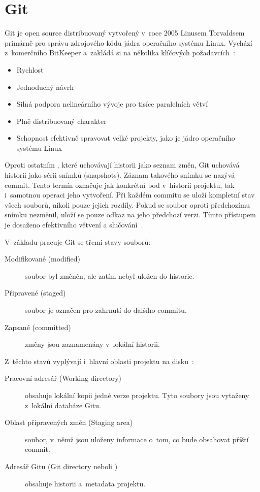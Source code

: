 
\section{Git}
\label{sec:git}
Git je open source distribuovaný \VCS vytvořený v~roce 2005 Linusem Torvaldsem primárně pro správu zdrojového kódu jádra operačního systému Linux. Vychází z~komerčního \VCS BitKeeper a~zakládá si na několika klíčových požadavcích~\cite{chacon2014progit}:
\begin{itemize}
  \item Rychlost
  \item Jednoduchý návrh
  \item Silná podpora nelineárního vývoje pro tisíce paralelních větví
  \item Plně distribuovaný charakter
  \item Schopnost efektivně spravovat velké projekty, jako je jádro operačního systému Linux
\end{itemize}

Oproti ostatním \VCS, které uchovávají historii jako seznam změn, Git uchovává historii jako sérii snímků (snapshots). Záznam takového snímku se nazývá commit. Tento termín označuje jak konkrétní bod v~historii projektu, tak i~samotnou operaci jeho vytvoření. Při každém commitu se uloží kompletní stav všech souborů, nikoli pouze jejich rozdíly. Pokud se soubor oproti předchozímu snímku nezměnil, uloží se pouze odkaz na jeho předchozí verzi. Tímto přístupem je dosaženo efektivního větvení a slučování~\cite{chacon2014progit}.

V~základu pracuje Git se třemi stavy souborů:
\begin{description}
  \item[Modifikované (modified)] soubor byl změněn, ale zatím nebyl uložen do historie.
  \item[Připravené (staged)] soubor je označen pro zahrnutí do dalšího commitu.
  \item[Zapsané (committed)] změny jsou zaznamenány v~lokální historii.
\end{description}

Z~těchto stavů vyplývají i~hlavní oblasti projektu na disku~\cite{chacon2014progit}:
\begin{description}
  \item[Pracovní adresář (Working directory)] obsahuje lokální kopii jedné verze projektu. Tyto soubory jsou vytaženy z~lokální databáze Gitu.
  \item[Oblast připravených změn (Staging area)] soubor, v~němž jsou uloženy informace o~tom, co bude obsahovat příští commit.
  \item[Adresář Gitu (Git directory neboli )] obsahuje historii a~metadata projektu.
\end{description}

